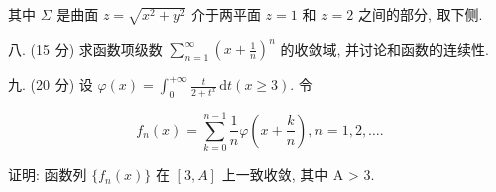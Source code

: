 \documentclass{examcollection}
\renewcommand{\displayformula}[1]{\[#1\]}
\begin{document}
{\begin{minipage}{\textwidth}
其中 $\Sigma$ 是曲面 $z = \sqrt{x^2 + y^2}$ 介于两平面 $z = 1$ 和 $z = 2$ 之间的部分, 取下侧.\par
八. (15 分) 求函数项级数 $\sum_{n=1}^{\infty}\left(x + \frac{1}{n}\right)^n$ 的收敛域, 并讨论和函数的连续性.\par
九. (20 分) 设 $\varphi(x) = \int_{0}^{+\infty} \frac{t}{2 + t^x} \, \mathrm{d}t (x \geq 3)$. 令\par
\displayformula{f _ {n} (x) = \sum_ {k = 0} ^ {n - 1} \frac {1}{n} \varphi \left(x + \frac {k}{n}\right), n = 1, 2, \dots .}\par
证明: 函数列  $\{f_{n}(x)\}$  在  $[3, A]$  上一致收敛, 其中 A > 3.\par
\end{minipage}}
\ifdim\dimexpr\ht\proofbox+\dp\proofbox\relax>\textheight
\noindent\resizebox{!}{\textheight}{\usebox{\proofbox}}\else\noindent\usebox{\proofbox}\fi\clearpage
\end{document}
